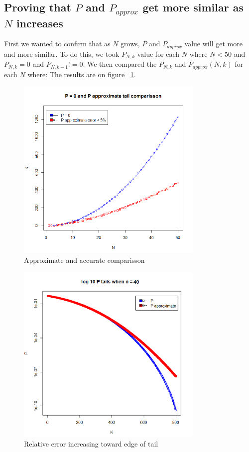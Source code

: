 \documentclass[12pt]{article}
\begin{document}
\subsection{Proving that $P$ and $P_{approx}$ get more similar as $N$ increases}
First we wanted to confirm that as $N$ grows, $P$ and $P_{approx}$ value will get more and more similar. To do this, we took $P_{N, k}$ value for each $N$ where
$N < 50$ and $P_{N, k}  = 0$ and $P_{N, k - 1} != 0$.
We then compared the $P_{N, k}$ and $P_{approx} (N, k)$ for each $N$ where:
The results are on figure ~\ref{fig:T0vsN}.


\begin{figure}[!ht]
	\centering
  \includegraphics[width=0.8\textwidth]{T0vsN}
	\caption{Approximate and accurate comparisson}
	\label{fig:T0vsN}
\end{figure}

\begin{figure}[!ht]
	\centering
  \includegraphics[width=0.8\textwidth]{log10PtailsN40}
	\caption{Relative error increasing toward edge of tail}
	\label{fig:log10PtailsN40}
\end{figure}
\end{document}
